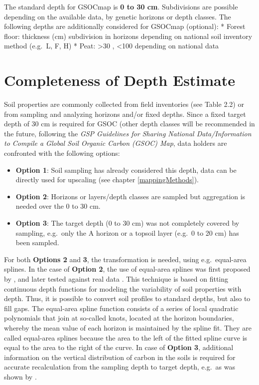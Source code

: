 \documentclass[10pt,b5paper,]{book}
\providecommand{\tightlist}{%
  \setlength{\itemsep}{0pt}\setlength{\parskip}{0pt}}
\theoremstyle{definition}
\theoremstyle{definition}
\theoremstyle{definition}
\theoremstyle{remark}
\begin{document}
The standard depth for GSOCmap is \textbf{0 to 30 cm}. Subdivisions are
possible depending on the available data, by genetic horizons or depth
classes. The following depths are additionally considered for GSOCmap
(optional): * Forest floor: thickness (cm) subdivision in horizons
depending on national soil inventory method (e.g.~L, F, H) * Peat:
\textgreater{}30 , \textless{}100 depending on national data

\hypertarget{completeness-of-depth-estimate}{%
\section{Completeness of Depth
Estimate}\label{completeness-of-depth-estimate}}

Soil properties are commonly collected from field inventories (see Table
2.2) or from sampling and analyzing horizons and/or fixed depths. Since
a fixed target depth of 30 cm is required for GSOC (other depth classes
will be recommended in the future, following the \emph{GSP Guidelines
for Sharing National Data/Information to Compile a Global Soil Organic
Carbon (GSOC) Map}, data holders are confronted with the following
options:

\begin{itemize}
\tightlist
\item
  \textbf{Option 1}: Soil sampling has already considered this depth,
  data can be directly used for upscaling (see chapter
  \ref{mappingMethods}).
\item
  \textbf{Option 2}: Horizons or layers/depth classes are sampled but
  aggregation is needed over the 0 to 30 cm.
\item
  \textbf{Option 3}: The target depth (0 to 30 cm) was not completely
  covered by sampling, e.g.~only the A horizon or a topsoil layer
  (e.g.~0 to 20 cm) has been sampled.
\end{itemize}

For both \textbf{Options 2} and \textbf{3}, the transformation is
needed, using e.g.~equal-area splines. In the case of \textbf{Option 2},
the use of equal-area splines was first proposed by
\cite{ponce1986improved}, and later tested against real data
\citep{bishop1999modelling}. This technique is based on fitting
continuous depth functions for modeling the variability of soil
properties with depth. Thus, it is possible to convert soil profiles to
standard depths, but also to fill gaps. The equal-area spline function
consists of a series of local quadratic polynomials that join at
so-called knots, located at the horizon boundaries, whereby the mean
value of each horizon is maintained by the spline fit. They are called
equal-area splines because the area to the left of the fitted spline
curve is equal to the area to the right of the curve. In case of
\textbf{Option 3}, additional information on the vertical distribution
of carbon in the soils is required for accurate recalculation from the
sampling depth to target depth, e.g.~as was shown by
\cite{bernoux1998modeling}.
\end{document}
